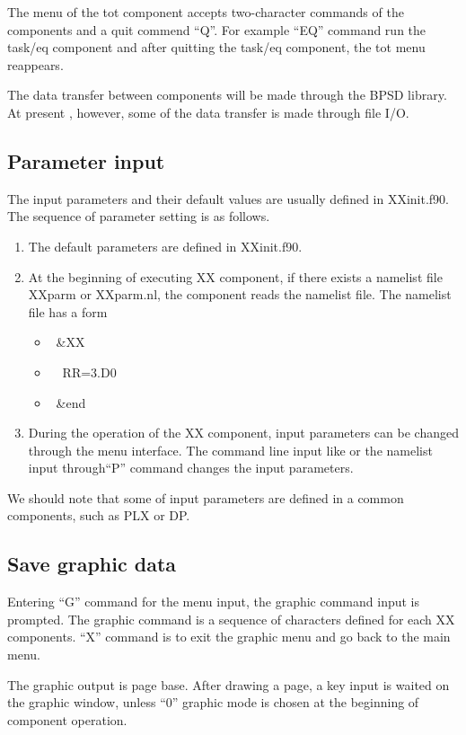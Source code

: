 \documentclass[11pt]{article}
\begin{document}
The menu of the tot component accepts two-character commands of the
components and a quit commend ``Q''.  For example ``EQ'' command run
the task/eq component and after quitting the task/eq component, the tot
menu reappears.  

The data transfer between components will be made through the BPSD
library.  At present , however, some of the data transfer is made
through file I/O.  

\subsection{Parameter input}

The input parameters and their default values are usually defined in
XXinit.f90.  The sequence of parameter setting is as follows.

\begin{enumerate}
\item
The default parameters are defined in XXinit.f90.
\item
At the beginning of executing XX component, if there exists a namelist file
XXparm or XXparm.nl, the component reads the namelist file. The
namelist file has a form
\begin{itemize}
\item[] \ \&XX
\item[] \ \ RR=3.D0
\item[] \ \&end
\end{itemize}
\item
During the operation of the XX component, input parameters can be
changed through the menu interface.  The command line input like
 or the namelist input through``P'' command changes the
input parameters.
\end{enumerate}

We should note that some of input parameters are defined in a common
components, such as PLX or DP. 

\subsection{Save graphic data}

Entering ``G'' command for the menu input, the graphic command input
is prompted.  The graphic command is a sequence of characters defined
for each XX components.  ``X'' command is to exit the graphic menu and
go back to the main menu. 

The graphic output is page base.  After drawing a page, a key input is
waited on the graphic window, unless ``0'' graphic mode is chosen at
the beginning of component operation. 
\end{document}
